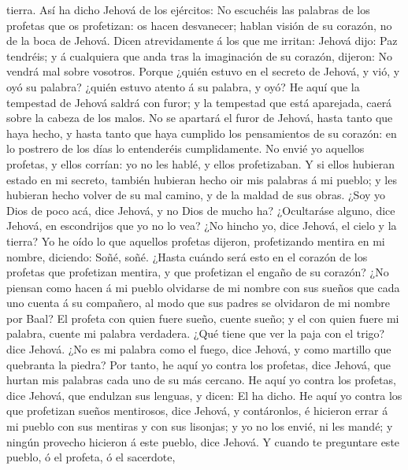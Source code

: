 tierra.  Así ha dicho Jehová de los ejércitos: No
escuchéis las palabras de los profetas que os profetizan: os hacen
desvanecer; hablan visión de su corazón, no de la boca de Jehová.
 Dicen atrevidamente á los que me irritan: Jehová dijo:
Paz tendréis; y á cualquiera que anda tras la imaginación de su corazón,
dijeron: No vendrá mal sobre vosotros.  Porque ¿quién
estuvo en el secreto de Jehová, y vió, y oyó su palabra? ¿quién estuvo
atento á su palabra, y oyó?  He aquí que la tempestad de
Jehová saldrá con furor; y la tempestad que está aparejada, caerá sobre
la cabeza de los malos.  No se apartará el furor de
Jehová, hasta tanto que haya hecho, y hasta tanto que haya cumplido los
pensamientos de su corazón: en lo postrero de los días lo entenderéis
cumplidamente.  No envié yo aquellos profetas, y ellos
corrían: yo no les hablé, y ellos profetizaban.  Y si
ellos hubieran estado en mi secreto, también hubieran hecho oir mis
palabras á mi pueblo; y les hubieran hecho volver de su mal camino, y de
la maldad de sus obras.  ¿Soy yo Dios de poco acá, dice
Jehová, y no Dios de mucho ha?  ¿Ocultaráse alguno, dice
Jehová, en escondrijos que yo no lo vea? ¿No hincho yo, dice Jehová, el
cielo y la tierra?  Yo he oído lo que aquellos profetas
dijeron, profetizando mentira en mi nombre, diciendo: Soñé, soñé.
 ¿Hasta cuándo será esto en el corazón de los profetas
que profetizan mentira, y que profetizan el engaño de su corazón?
 ¿No piensan como hacen á mi pueblo olvidarse de mi
nombre con sus sueños que cada uno cuenta á su compañero, al modo que
sus padres se olvidaron de mi nombre por Baal?  El
profeta con quien fuere sueño, cuente sueño; y el con quien fuere mi
palabra, cuente mi palabra verdadera. ¿Qué tiene que ver la paja con el
trigo? dice Jehová.  ¿No es mi palabra como el fuego,
dice Jehová, y como martillo que quebranta la piedra? 
Por tanto, he aquí yo contra los profetas, dice Jehová, que hurtan mis
palabras cada uno de su más cercano.  He aquí yo contra
los profetas, dice Jehová, que endulzan sus lenguas, y dicen: El ha
dicho.  He aquí yo contra los que profetizan sueños
mentirosos, dice Jehová, y contáronlos, é hicieron errar á mi pueblo con
sus mentiras y con sus lisonjas; y yo no los envié, ni les mandé; y
ningún provecho hicieron á este pueblo, dice Jehová.  Y
cuando te preguntare este pueblo, ó el profeta, ó el sacerdote,
